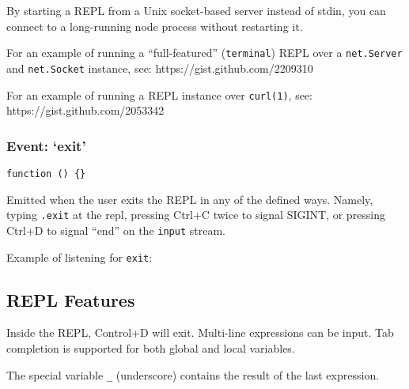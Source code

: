 By starting a REPL from a Unix socket-based server instead of stdin, you
can connect to a long-running node process without restarting it.

For an example of running a ``full-featured'' (\texttt{terminal}) REPL
over a \texttt{net.Server} and \texttt{net.Socket} instance, see:
https://gist.github.com/2209310

For an example of running a REPL instance over \texttt{curl(1)}, see:
https://gist.github.com/2053342

\subsubsection{Event: `exit'}

\texttt{function () \{\}}

Emitted when the user exits the REPL in any of the defined ways. Namely,
typing \texttt{.exit} at the repl, pressing Ctrl+C twice to signal
SIGINT, or pressing Ctrl+D to signal ``end'' on the \texttt{input}
stream.

Example of listening for \texttt{exit}:

\begin{Shaded}
\begin{Highlighting}[]
\NormalTok{(}\NormalTok{, } \NormalTok{() \{}
  \NormalTok{(}\NormalTok{);}
  \NormalTok{();}
\NormalTok{\});}
\end{Highlighting}
\end{Shaded}

\subsection{REPL Features}

Inside the REPL, Control+D will exit. Multi-line expressions can be
input. Tab completion is supported for both global and local variables.

The special variable \texttt{\_} (underscore) contains the result of the
last expression.

\begin{Shaded}
\begin{Highlighting}[]
\NormalTok{> [ }\NormalTok{, }\NormalTok{, } \NormalTok{]}
\NormalTok{[ }\NormalTok{, }\NormalTok{, } \NormalTok{]}
\NormalTok{> }\KeywordTok{_}
\NormalTok{> _ += }
\end{Highlighting}
\end{Shaded}

